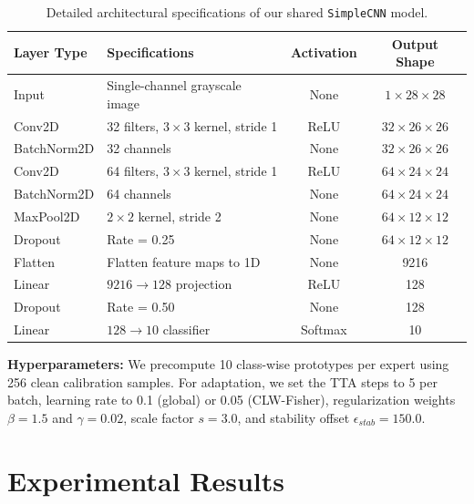 \documentclass{article}
\theoremstyle{plain}
\theoremstyle{definition}
\theoremstyle{remark}
\begin{document}
\begin{table}[tb]
  \centering
  \caption{Detailed architectural specifications of our shared \texttt{SimpleCNN} model.}
  \label{tab:architecture}
  \vskip 0.15in
  \begin{small}
    \scshape
    \begin{tabular}{llcc}
      \toprule
      Layer Type & Specifications & Activation & Output Shape \\
      \midrule
      Input & Single-channel grayscale image & None & $1 \times 28 \times 28$ \\
      Conv2D & 32 filters, $3 \times 3$ kernel, stride 1 & ReLU & $32 \times 26 \times 26$ \\
      BatchNorm2D & 32 channels & None & $32 \times 26 \times 26$ \\
      Conv2D & 64 filters, $3 \times 3$ kernel, stride 1 & ReLU & $64 \times 24 \times 24$ \\
      BatchNorm2D & 64 channels & None & $64 \times 24 \times 24$ \\
      MaxPool2D & $2 \times 2$ kernel, stride 2 & None & $64 \times 12 \times 12$ \\
      Dropout & Rate = 0.25 & None & $64 \times 12 \times 12$ \\
      Flatten & Flatten feature maps to 1D & None & 9216 \\
      Linear & $9216 \to 128$ projection & ReLU & 128 \\
      Dropout & Rate = 0.50 & None & 128 \\
      Linear & $128 \to 10$ classifier & Softmax & 10 \\
      \bottomrule
    \end{tabular}
  \end{small}
  \vskip -0.1in
\end{table}

\textbf{Hyperparameters:} We precompute 10 class-wise prototypes per expert using 256 clean calibration samples. For adaptation, we set the TTA steps to 5 per batch, learning rate to 0.1 (global) or 0.05 (CLW-Fisher), regularization weights $\beta=1.5$ and $\gamma=0.02$, scale factor $s=3.0$, and stability offset $\epsilon_{stab}=150.0$.

\section{Experimental Results}
\label{sec:results}
\end{document}
